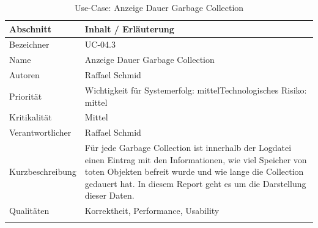 \begin{longtable}{|p{4cm}|p{10.5cm}|}
\hline
   \textbf{Abschnitt} & \textbf{Inhalt / Erläuterung} \\\hline
   Bezeichner & UC-04.3\\\hline
   Name & Anzeige Dauer Garbage Collection\\\hline
   Autoren & Raffael Schmid\\\hline
   Priorität & Wichtigkeit für Systemerfolg: mittel\newline Technologisches Risiko: mittel\\\hline
   Kritikalität & Mittel\\\hline
   Verantwortlicher & Raffael Schmid\\\hline
   Kurzbeschreibung & Für jede Garbage Collection ist innerhalb der Logdatei einen Eintrag mit den Informationen, wie viel Speicher von toten Objekten befreit wurde und wie lange die Collection gedauert hat. In diesem Report geht es um die Darstellung dieser Daten.\\\hline
   Qualitäten &  Korrektheit, Performance, Usability\\\hline
\caption{Use-Case: Anzeige Dauer Garbage Collection}
\end{longtable}

